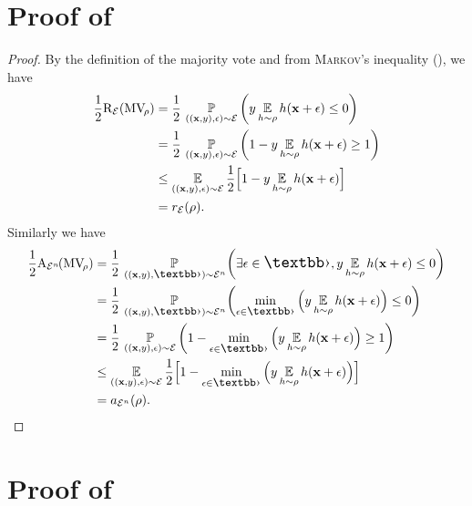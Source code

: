 \begin{noaddcontents}
\section{Proof of }
\label{ap:mv-robustness:sec:proof-2-adver-gibbs}

\theoremadvergibbs*
\begin{proof}
By the definition of the majority vote and from \textsc{Markov}'s inequality (), we have 
\begin{align*}
    \frac12 \text{R}_{{\mathcal{E}}}(\text{MV}_{\!\rho})
    &= \frac12\, \operatorname*{\mathbb{P}}_{( (\mathbf{x},y),\epsilon)\sim{\ensuremath{\mathcal{E}}}} \left( y \operatorname*{\mathbb{E}}_{h\sim\rho} h(\mathbf{x}+\epsilon) \le 0\right)\\
    &= \frac12 \, \operatorname*{\mathbb{P}}_{( (\mathbf{x},y),\epsilon)\sim{\ensuremath{\mathcal{E}}}}\left( 1 - y \operatorname*{\mathbb{E}}_{h\sim\rho} h(\mathbf{x}+\epsilon) \ge 1\right)\\
    &\leq  \operatorname*{\mathbb{E}}_{( (\mathbf{x},y),\epsilon)\sim{\ensuremath{\mathcal{E}}}} \frac12 \Big[ 1 - y \operatorname*{\mathbb{E}}_{h\sim\rho} h(\mathbf{x}+\epsilon) \Big]\\
    &= r_{{\mathcal{E}}}(\rho).
\end{align*}
    Similarly we have
\begin{align*}
    \frac12\RiskM_{\Dpert^{n\!}}(\MVQ) &=\frac12\,\PP_{( (\x,\y),\Epert)\sim\Dpert^{n\!}} \LP \exists \epsilon \in\Epert, \y \EE_{\h\sim\Q} \h(\x+\epsilon)\le 0 \RP\\
    &=\frac12\,\PP_{( (\x,\y),\Epert)\sim\Dpert^{n\!}} \LP \min_{\epsilon\in\Epert} \Big( \y \EE_{\h\sim\Q} \h(\x+\epsilon)\Big) \le 0 \RP\\
    &= \frac12 \, \PP_{( (\x,\y),\epsilon)\sim\Dpert}\LP 1 - \min_{\epsilon\in\Epert} \Big( \y \EE_{\h\sim\Q} \h(\x+\epsilon)\Big) \ge 1\RP\\
    &\leq \EE_{( (\x,\y),\epsilon)\sim\Dpert} \frac12 \Big[ 1 - \min_{\epsilon\in\Epert}\Big( \y \EE_{\h\sim\Q} \h(\x+\epsilon)\Big) \Big]\\
    &= \RiskMS_{\Dpert^{n}}(\Q).
\end{align*}
\end{proof}

\section{Proof of }
\label{ap:mv-robustness:sec:proof-chromatic}


\end{noaddcontents}
